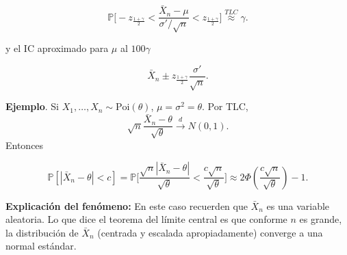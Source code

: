 \documentclass[
  12pt,
]{book}
\begin{document}
\[
\mathbb P \bigg[-z_{\frac{1+\gamma}2}<\dfrac{\bar X_n-\mu}{\sigma'/\sqrt n}
<z_{\frac{1+\gamma}2}\bigg] \stackrel{TLC}{\approx} \gamma.
\]

y el IC aproximado para \(\mu\) al \(100\gamma\)

\[\bar X_n \pm z_{\frac{1+\gamma}2}\dfrac{\sigma'}{\sqrt n}.\]

\textbf{Ejemplo}. Si \(X_1,\dots, X_n\sim \text{Poi}(\theta)\), \(\mu =\sigma^2 = \theta\). Por TLC,
\[\sqrt n\dfrac{\bar X_n-\theta}{\sqrt{\theta}}\xrightarrow[]{d}N(0,1).\] Entonces

\[
\mathbb P[|\bar X_n-\theta|<c] = \mathbb P\bigg[\dfrac{\sqrt n|\bar X_n-\theta|}{\sqrt \theta}<\dfrac{c\sqrt n}{\sqrt \theta}\bigg] \approx 2\Phi\left(\dfrac{c\sqrt n}{\sqrt \theta}\right)-1.
\]

\textbf{Explicación del fenómeno:} En este caso recuerden que \(\bar{X}_n\) es una
variable aleatoria. Lo que dice el teorema del límite central es que conforme
\(n\) es grande, la distribución de \(\bar{X}_n\) (centrada y escalada
apropiadamente) converge a una normal estándar.
\end{document}
